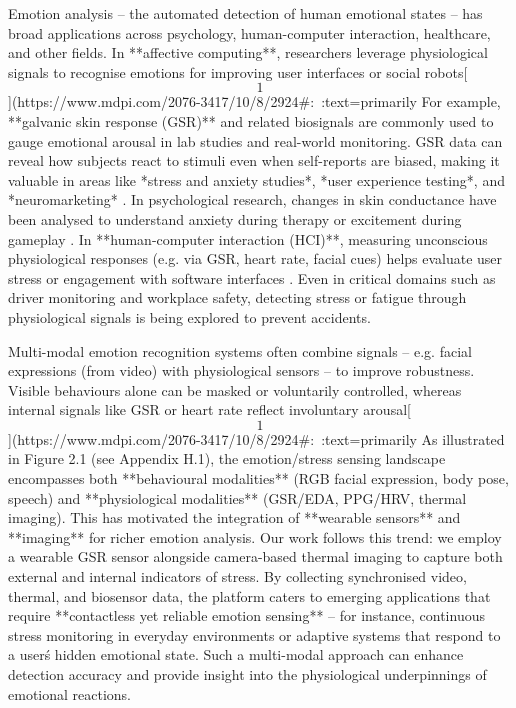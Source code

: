 \documentclass[12pt,a4paper]{article}
\begin{document}
Emotion analysis -- the automated detection of human emotional states --
has broad applications across psychology, human-computer interaction,
healthcare, and other fields. In **affective computing**, researchers
leverage physiological signals to recognise emotions for improving user
interfaces or social
robots[\[1\]](https://www.mdpi.com/2076-3417/10/8/2924#:~:text=primarily%
For example, **galvanic skin response (GSR)** and related biosignals are
commonly used to gauge emotional arousal in lab studies and real-world
monitoring. GSR data can reveal how subjects react to stimuli even when
self-reports are biased, making it valuable in areas like *stress and
anxiety studies*, *user experience testing*, and
*neuromarketing* \citep{Boucsein2012}.
In psychological research, changes in skin conductance have been
analysed to understand anxiety during therapy or excitement during
gameplay \citep{Boucsein2012}.
In **human-computer interaction (HCI)**, measuring unconscious
physiological responses (e.g. via GSR, heart rate, facial cues) helps
evaluate user stress or engagement with software
interfaces \citep{Boucsein2012}.
Even in critical domains such as driver monitoring and workplace safety,
detecting stress or fatigue through physiological signals is being
explored to prevent accidents.

Multi-modal emotion recognition systems often combine signals -- e.g.
facial expressions (from video) with physiological sensors -- to improve
robustness. Visible behaviours alone can be masked or voluntarily
controlled, whereas internal signals like GSR or heart rate reflect
involuntary
arousal[\[1\]](https://www.mdpi.com/2076-3417/10/8/2924#:~:text=primarily%
As illustrated in Figure 2.1 (see Appendix H.1), the emotion/stress sensing landscape encompasses both **behavioural modalities** (RGB facial expression, body pose, speech) and **physiological modalities** (GSR/EDA, PPG/HRV, thermal imaging). This has motivated the integration of **wearable sensors** and
**imaging** for richer emotion analysis. Our work follows this trend: we
employ a wearable GSR sensor alongside camera-based thermal imaging to
capture both external and internal indicators of stress. By collecting
synchronised video, thermal, and biosensor data, the platform caters to
emerging applications that require **contactless yet reliable emotion
sensing** -- for instance, continuous stress monitoring in everyday
environments or adaptive systems that respond to a user\'s hidden
emotional state. Such a multi-modal approach can enhance detection
accuracy and provide insight into the physiological underpinnings of
emotional reactions.
\end{document}
